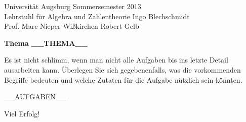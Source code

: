 \documentclass{../algblatt}
\begin{document}
\vspace*{-1.2cm}

Universität Augsburg \hfill Sommersemester 2013 \\
Lehrstuhl für Algebra und Zahlentheorie \hfill Ingo Blechschmidt \\
Prof. Marc Nieper-Wißkirchen \hfill Robert Gelb \\[0em]

\begin{center}
  {\Large \textbf{Thema __THEMA__}} \\[2.6em]

  \begin{minipage}{0.93\textwidth}
    \setlength\parskip{\medskipamount}
    Es ist nicht schlimm, wenn man nicht alle Aufgaben bis ins letzte Detail
    ausarbeiten kann. Überlegen Sie sich gegebenenfalls, was die
    vorkommenden Begriffe bedeuten und welche Zutaten für die Aufgabe nützlich
    sein könnten.
  \end{minipage}
\end{center}
\vspace{1em}

__AUFGABEN__

\begin{center}Viel Erfolg!\end{center}
\end{document}
